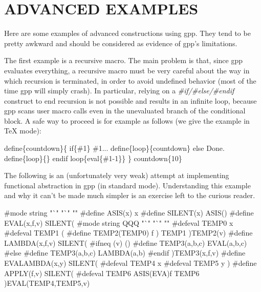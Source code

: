 \htmlHR

\section{ADVANCED EXAMPLES}

Here are some examples of advanced constructions using gpp. They tend to be
pretty awkward and should be considered as evidence of gpp's limitations. 

The first example is a recursive macro. The main problem is that, since gpp
evaluates everything, a recursive macro must be very careful about the way in
which recursion is terminated, in order to avoid undefined behavior (most of
the time gpp will simply crash). In particular, relying on a {\it
\#if/\#else/\#endif} construct to end recursion is not possible and results in
an infinite loop, because gpp scans user macro calls even in the unevaluated
branch of the conditional block. A safe way to proceed is for example as
follows (we give the example in TeX mode): 

\begin{PRE}
  {\htmlBackslash}define\{countdown\}\{
    {\htmlBackslash}if\{\#1\}
    \#1...
    {\htmlBackslash}define\{loop\}\{{\htmlBackslash}countdown\}
    {\htmlBackslash}else
    Done.
    {\htmlBackslash}define\{loop\}\{\}
    {\htmlBackslash}endif
    {\htmlBackslash}loop\{{\htmlBackslash}eval\{\#1-1\}\}
  \}
  {\htmlBackslash}countdown\{10\}
\end{PRE}

The following is an (unfortunately very weak) attempt at implementing
functional abstraction in gpp (in standard mode). Understanding this example
and why it can't be made much simpler is an exercise left to the curious
reader. 

\begin{PRE}
  \#mode string "`" "`" "{\htmlBackslash}{\htmlBackslash}"
  \#define ASIS(x) x
  \#define SILENT(x) ASIS()
  \#define EVAL(x,f,v) SILENT(
    \#mode string QQQ "`" "`" "{\htmlBackslash}{\htmlBackslash}"
    \#defeval TEMP0 x
    \#defeval TEMP1 (
      {\htmlBackslash}\#define {\htmlBackslash}TEMP2(TEMP0) f
    )
    TEMP1
    )TEMP2(v)
  \#define LAMBDA(x,f,v) SILENT(
    \#ifneq (v) ()
    \#define TEMP3(a,b,c) EVAL(a,b,c)
    \#else
    \#define TEMP3(a,b,c) {\htmlBackslash}LAMBDA(a,b)
    \#endif
    )TEMP3(x,f,v)
  \#define EVALAMBDA(x,y) SILENT(
    \#defeval TEMP4 x
    \#defeval TEMP5 y
    ) 
  \#define APPLY(f,v) SILENT(
    \#defeval TEMP6 ASIS({\htmlBackslash}EVA)f
    TEMP6
    )EVAL(TEMP4,TEMP5,v)
\end{PRE}

